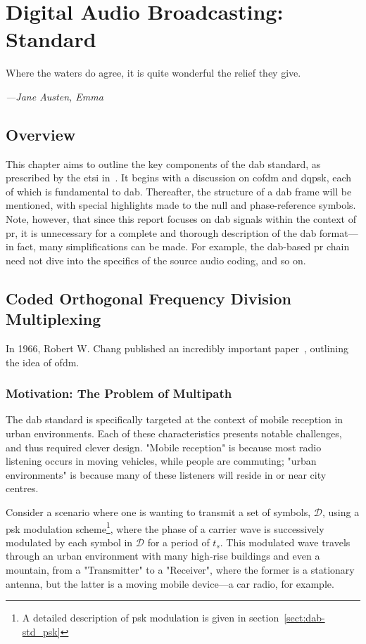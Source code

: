 \documentclass[class=report,11pt,crop=false]{standalone}
\begin{document}
\ifstandalone
\tableofcontents
\fi
\chapter{Digital Audio Broadcasting: Standard}
\epigraph{Where the waters do agree, it is quite wonderful the relief they give.}%
{\emph{---Jane Austen, Emma}}

\section{Overview}
This chapter aims to outline the key components of the \gls{dab} standard, as prescribed by the \gls{etsi} in~\cite{dabstandard}. It begins with a discussion on \gls{cofdm} and \gls{dqpsk}, each of which is fundamental to \gls{dab}. Thereafter, the structure of a \gls{dab} frame will be mentioned, with special highlights made to the null and phase-reference symbols. Note, however, that since this report focuses on \gls{dab} signals within the context of \gls{pr}, it is unnecessary for a complete and thorough description of the \gls{dab} format---in fact, many simplifications can be made. For example, the \gls{dab}-based \gls{pr} chain need not dive into the specifics of the source audio coding, and so on.

\section{Coded Orthogonal Frequency Division Multiplexing}
In 1966, Robert W. Chang published an incredibly important paper~\cite{Chang1966}, outlining the idea of \gls{ofdm}.

\subsection{Motivation: The Problem of Multipath \label{subsect:multipath}}

The \gls{dab} standard is specifically targeted at the context of mobile reception in urban environments. Each of these characteristics presents notable challenges, and thus required clever design. "Mobile reception" is because most radio listening occurs in moving vehicles, while people are commuting; "urban environments" is because many of these listeners will reside in or near city centres.

Consider a scenario where one is wanting to transmit a set of symbols, \(\mathcal{D}\), using a \gls{psk} modulation scheme\footnote{A detailed description of \gls{psk} modulation is given in section~\ref{sect:dab-std_psk}}, where the phase of a carrier wave is successively modulated by each symbol in \(\mathcal{D}\) for a period of \(t_s\). This modulated wave travels through an urban environment with many high-rise buildings and even a mountain, from a "Transmitter" to a "Receiver", where the former is a stationary antenna, but the latter is a moving mobile device---a car radio, for example.
\end{document}
